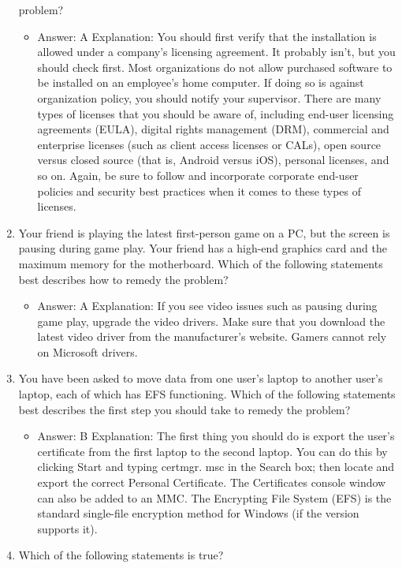 \documentclass{article}
\begin{document}
\begin{enumerate}
problem?
    \begin{itemize}
        \item Answer: A
Explanation: You should first verify that the installation is allowed under a company’s
licensing agreement. It probably isn’t, but you should check first. Most organizations
do not allow purchased software to be installed on an employee’s home computer.
If doing so is against organization policy, you should notify your supervisor. There
are many types of licenses that you should be aware of, including end-user licensing
agreements (EULA), digital rights management (DRM), commercial and enterprise
licenses (such as client access licenses or CALs), open source versus closed source
(that is, Android versus iOS), personal licenses, and so on. Again, be sure to follow
and incorporate corporate end-user policies and security best practices when it comes
to these types of licenses.
    \end{itemize}
    \item Your friend is playing the latest first-person game on a PC, but the
screen is pausing during game play. Your friend has a high-end
graphics card and the maximum memory for the motherboard.
Which of the following statements best describes how to remedy
the problem?
    \begin{itemize}
        \item Answer: A
Explanation: If you see video issues such as pausing during game play, upgrade the
video drivers. Make sure that you download the latest video driver from the manufacturer’s
website. Gamers cannot rely on Microsoft drivers.
    \end{itemize}
    \item You have been asked to move data from one user’s laptop to
another user’s laptop, each of which has EFS functioning. Which of
the following statements best describes the first step you should
take to remedy the problem?
    \begin{itemize}
        \item Answer: B
Explanation: The first thing you should do is export the user’s certificate from the first
laptop to the second laptop. You can do this by clicking Start and typing certmgr.
msc in the Search box; then locate and export the correct Personal Certificate. The
Certificates console window can also be added to an MMC. The Encrypting File System
(EFS) is the standard single-file encryption method for Windows (if the version supports
it).
    \end{itemize}
    \item Which of the following statements is true?

\end{enumerate}
\end{document}
